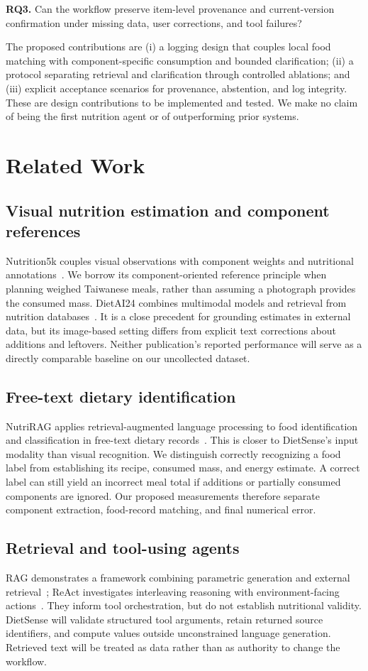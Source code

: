 \documentclass[11pt,a4paper]{article}
\begin{document}
\textbf{RQ3.} Can the workflow preserve item-level provenance and current-version confirmation under missing data, user corrections, and tool failures?

The proposed contributions are (i) a logging design that couples local food matching with component-specific consumption and bounded clarification; (ii) a protocol separating retrieval and clarification through controlled ablations; and (iii) explicit acceptance scenarios for provenance, abstention, and log integrity. These are design contributions to be implemented and tested. We make no claim of being the first nutrition agent or of outperforming prior systems.

\section{Related Work}
\subsection{Visual nutrition estimation and component references}
Nutrition5k couples visual observations with component weights and nutritional annotations~\cite{nutrition5k}. We borrow its component-oriented reference principle when planning weighed Taiwanese meals, rather than assuming a photograph provides the consumed mass. DietAI24 combines multimodal models and retrieval from nutrition databases~\cite{dietai24}. It is a close precedent for grounding estimates in external data, but its image-based setting differs from explicit text corrections about additions and leftovers. Neither publication's reported performance will serve as a directly comparable baseline on our uncollected dataset.

\subsection{Free-text dietary identification}
NutriRAG applies retrieval-augmented language processing to food identification and classification in free-text dietary records~\cite{nutrirag}. This is closer to DietSense's input modality than visual recognition. We distinguish correctly recognizing a food label from establishing its recipe, consumed mass, and energy estimate. A correct label can still yield an incorrect meal total if additions or partially consumed components are ignored. Our proposed measurements therefore separate component extraction, food-record matching, and final numerical error.

\subsection{Retrieval and tool-using agents}
RAG demonstrates a framework combining parametric generation and external retrieval~\cite{rag}; ReAct investigates interleaving reasoning with environment-facing actions~\cite{react}. They inform tool orchestration, but do not establish nutritional validity. DietSense will validate structured tool arguments, retain returned source identifiers, and compute values outside unconstrained language generation. Retrieved text will be treated as data rather than as authority to change the workflow.
\end{document}
